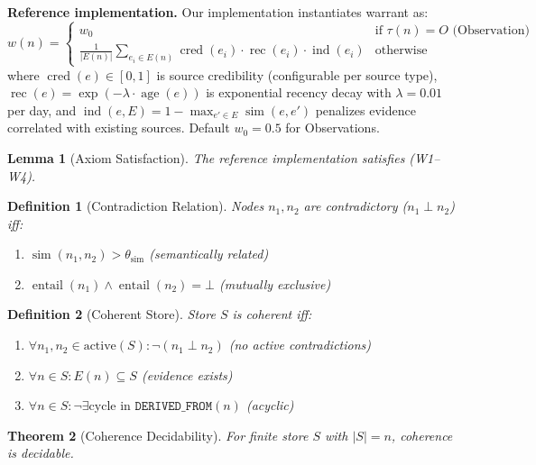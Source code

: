 \documentclass[11pt,letterpaper]{article}
\newtheorem{definition}{Definition}[section]
\newtheorem{theorem}{Theorem}[section]
\newtheorem{lemma}[theorem]{Lemma}
\begin{document}
\textbf{Reference implementation.} Our implementation instantiates warrant as:
\[
w(n) = \begin{cases}
w_0 & \text{if } \tau(n) = O \text{ (Observation)} \\[4pt]
\displaystyle\frac{1}{|E(n)|} \sum_{e_i \in E(n)} \operatorname{cred}(e_i) \cdot \operatorname{rec}(e_i) \cdot \operatorname{ind}(e_i) & \text{otherwise}
\end{cases}
\]
where $\operatorname{cred}(e) \in [0,1]$ is source credibility (configurable per source type), $\operatorname{rec}(e) = \exp(-\lambda \cdot \operatorname{age}(e))$ is exponential recency decay with $\lambda = 0.01$ per day, and $\operatorname{ind}(e, E) = 1 - \max_{e' \in E} \operatorname{sim}(e, e')$ penalizes evidence correlated with existing sources. Default $w_0 = 0.5$ for Observations.

\begin{lemma}[Axiom Satisfaction]
\label{lem:monotone}
The reference implementation satisfies (W1--W4).
\end{lemma}

\begin{definition}[Contradiction Relation]
\label{def:contradiction}
Nodes $n_1, n_2$ are contradictory ($n_1 \perp n_2$) iff:
\begin{enumerate}[noitemsep]
    \item $\operatorname{sim}(n_1, n_2) > \theta_{\text{sim}}$ (semantically related)
    \item $\operatorname{entail}(n_1) \wedge \operatorname{entail}(n_2) = \bot$ (mutually exclusive)
\end{enumerate}
\end{definition}

\begin{definition}[Coherent Store]
\label{def:coherent}
Store $S$ is coherent iff:
\begin{enumerate}[noitemsep]
    \item $\forall n_1, n_2 \in \text{active}(S): \neg(n_1 \perp n_2)$ (no active contradictions)
    \item $\forall n \in S: E(n) \subseteq S$ (evidence exists)
    \item $\forall n \in S: \neg\exists \text{cycle in } \texttt{DERIVED\_FROM}(n)$ (acyclic)
\end{enumerate}
\end{definition}

\begin{theorem}[Coherence Decidability]
\label{thm:coherence}
For finite store $S$ with $|S| = n$, coherence is decidable.
\end{theorem}
\end{document}
